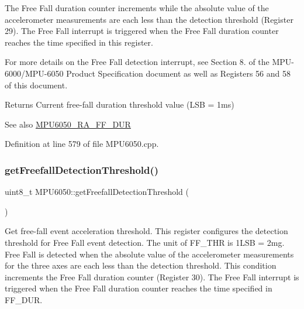The Free Fall duration counter increments while the absolute value of the accelerometer measurements are each less than the detection threshold (Register 29). The Free Fall interrupt is triggered when the Free Fall duration counter reaches the time specified in this register.

For more details on the Free Fall detection interrupt, see Section 8. of the M\+P\+U-\/6000/\+M\+P\+U-\/6050 Product Specification document as well as Registers 56 and 58 of this document.

\begin{DoxyReturn}{Returns}
Current free-\/fall duration threshold value (L\+SB = 1ms) 
\end{DoxyReturn}
\begin{DoxySeeAlso}{See also}
\mbox{\hyperlink{MPU6050_8h_aaf242278f1dd87556bdeeab589b01fd7}{M\+P\+U6050\+\_\+\+R\+A\+\_\+\+F\+F\+\_\+\+D\+UR}} 
\end{DoxySeeAlso}


Definition at line 579 of file M\+P\+U6050.\+cpp.


\begin{DoxyCode}{0}

\end{DoxyCode}
\mbox{\label{classMPU6050_ac7f5c0511fe9d0f3525a3757498daed7}} 
\subsubsection{\texorpdfstring{getFreefallDetectionThreshold()}{getFreefallDetectionThreshold()}}
{\footnotesize\ttfamily uint8\+\_\+t M\+P\+U6050\+::get\+Freefall\+Detection\+Threshold (\begin{DoxyParamCaption}{ }\end{DoxyParamCaption})}

Get free-\/fall event acceleration threshold. This register configures the detection threshold for Free Fall event detection. The unit of F\+F\+\_\+\+T\+HR is 1L\+SB = 2mg. Free Fall is detected when the absolute value of the accelerometer measurements for the three axes are each less than the detection threshold. This condition increments the Free Fall duration counter (Register 30). The Free Fall interrupt is triggered when the Free Fall duration counter reaches the time specified in F\+F\+\_\+\+D\+UR.

